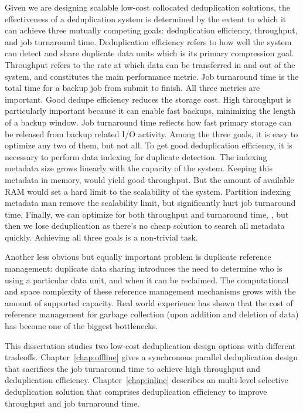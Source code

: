 Given we are designing scalable low-cost collocated deduplication solutions,
the effectiveness of a deduplication system is determined 
by the extent to which it can achieve three mutually competing goals: 
deduplication efficiency, throughput, and job turnaround time. 
Deduplication efficiency refers to
how well the system can detect and share duplicate data
units which is its primary compression goal. Throughput refers
to the rate at which data can be transferred in and out of
the system, and constitutes the main performance metric.
Job turnaround time is the total time for a backup job from submit to finish.
All three metrics are important. Good dedupe efficiency 
reduces the storage cost. High throughput
is particularly important because it can enable fast backups, 
minimizing the length of a backup window. 
Job turnaround time reflects how fast primary storage 
can be released from backup related I/O activity.
Among the three goals, it is easy to optimize any two of them,
but not all. To get good deduplication efficiency, 
it is necessary to perform data indexing for duplicate detection.
The indexing metadata size grows linearly with the capacity of the system. 
Keeping this metadata in memory,
would yield good throughput. 
But the amount of available RAM would set a hard limit to the scalability of the
system. Partition indexing metadata man remove
the scalability limit, but significantly hurt job turnaround time.
Finally, we can optimize for both throughput and turnaround time, 
, but then we lose deduplication as there's no cheap solution to search all metadata quickly. 
Achieving all three goals is a non-trivial task.

Another less obvious but equally important problem is
duplicate reference management: duplicate data sharing
introduces the need to determine who is using a particular data unit, and when it can be reclaimed. 
The computational and space complexity of these reference management mechanisms grows 
with the amount of supported capacity. Real world experience has shown that the
cost of reference management for garbage collection (upon addition and deletion of data) 
has become one of the biggest 
bottlenecks.

This dissertation studies two low-cost deduplication design options with different tradeoffs. 
Chapter~\ref{chap:offline} gives a synchronous parallel deduplication design that
sacrifices the job turnaround time to achieve high throughput and deduplication efficiency.
Chapter~\ref{chap:inline} describes an multi-level selective deduplication solution
that comprises deduplication efficiency to improve throughput and job turnaround time.

